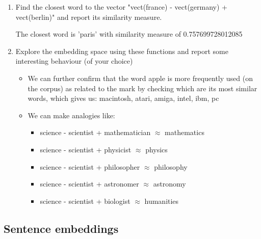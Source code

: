 \documentclass{article} %
\begin{document}
\begin{enumerate}
    \item
    Find the closest word to the vector "vect(france) - vect(germany) + vect(berlin)" and
    report its similarity measure.

    The closest word is 'paris' with similarity measure of 0.757699728012085

\newpage
    \item
    Explore the embedding space using these functions and report some interesting
    behaviour (of your choice)

    \begin{itemize}
        \item
        We can further confirm that the word apple is more frequently used (on the
        corpus) as related to the mark by checking which are its most similar words,
        which gives us: macintosh, atari, amiga, intel, ibm, pc
        \item
        We can make analogies like:
        \begin{itemize}
            \item science - scientist + mathematician $\approx$ mathematics
            \item science - scientist + physicist $\approx$ physics
            \item science - scientist + philosopher $\approx$ philosophy
            \item science - scientist + astronomer $\approx$ astronomy
            \item science - scientist + biologist $\approx$ humanities
        \end{itemize}
    \end{itemize}

\end{enumerate}

\subsection{Sentence embeddings}
\end{document}
